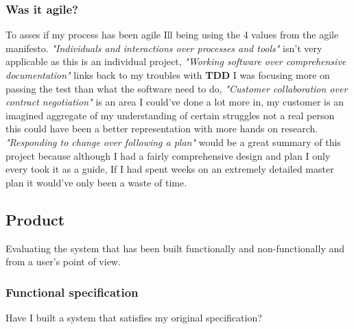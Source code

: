 \documentclass[12pt]{article}
\begin{document}
\subsubsection{Was it agile?}

To asses if my process has been agile Ill being using the 4 values from the agile manifesto\cite{agile}. \textit{"Individuals and interactions over processes and tools"} isn't very applicable as this is an individual project, \textit{"Working software over comprehensive documentation"} links back to my troubles with \textbf{TDD} I was focusing more on passing the test than what the software need to do, \textit{"Customer collaboration over contract negotiation"} is an area I could've done a lot more in, my customer is an imagined aggregate of my understanding of certain struggles not a real person this could have been a better representation with more hands on research. \textit{"Responding to change over following a plan"} would be a great summary of this project because although I had a fairly comprehensive design and plan I only every took it as a guide, If I had spent weeks on an extremely detailed master plan it would've only been a waste of time.

\subsection{Product}
Evaluating the system that has been built functionally and non-functionally and from a user's point of view.


\subsubsection{Functional specification}

Have I built a system that satisfies my original specification?
\end{document}
